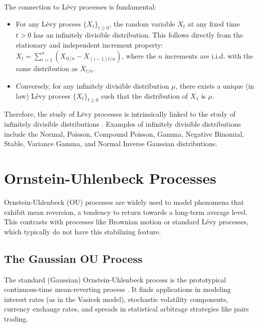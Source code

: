 \documentclass[11pt,twoside,openright]{report}
\begin{document}
The connection to Lévy processes is fundamental:
\begin{itemize}
    \item For any Lévy process $\{X_t\}_{t \ge 0}$, the random variable $X_t$ at any fixed time $t > 0$ has an infinitely divisible distribution. This follows directly from the stationary and independent increment property: $X_t = \sum_{i=1}^n (X_{it/n} - X_{(i-1)t/n})$, where the $n$ increments are i.i.d. with the same distribution as $X_{t/n}$.
    \item Conversely, for any infinitely divisible distribution $\mu$, there exists a unique (in law) Lévy process $\{X_t\}_{t \ge 0}$ such that the distribution of $X_1$ is $\mu$.
\end{itemize}
Therefore, the study of Lévy processes is intrinsically linked to the study of infinitely divisible distributions \cite{sato1999levy}. Examples of infinitely divisible distributions include the Normal, Poisson, Compound Poisson, Gamma, Negative Binomial, Stable, Variance Gamma, and Normal Inverse Gaussian distributions.

\section{Ornstein-Uhlenbeck Processes}
\label{sec:ou_processes}

Ornstein-Uhlenbeck (OU) processes are widely used to model phenomena that exhibit mean reversion, a tendency to return towards a long-term average level. This contrasts with processes like Brownian motion or standard Lévy processes, which typically do not have this stabilizing feature.

\subsection{The Gaussian OU Process}
\label{subsec:gaussian_ou}

The standard (Gaussian) Ornstein-Uhlenbeck process is the prototypical continuous-time mean-reverting process \cite{karatzas1991brownian}. It finds applications in modeling interest rates (as in the Vasicek model), stochastic volatility components, currency exchange rates, and spreads in statistical arbitrage strategies like pairs trading.
\end{document}
